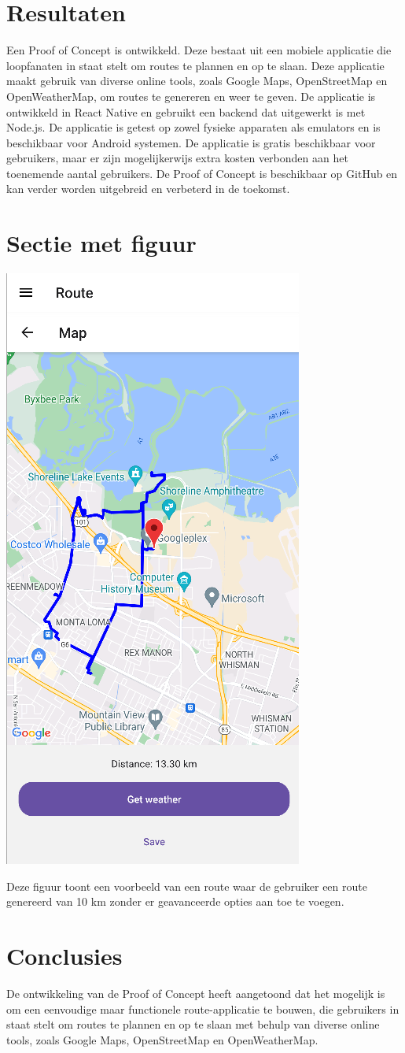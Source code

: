 \documentclass[a0,portrait]{hogent-poster}
\begin{document}
\begin{multicols}{2}
\section{Resultaten}

Een Proof of Concept is ontwikkeld. Deze bestaat uit een mobiele applicatie die loopfanaten in staat stelt om routes te plannen en op te slaan. Deze applicatie maakt gebruik van diverse online tools, zoals Google Maps, OpenStreetMap en OpenWeatherMap, om routes te genereren en weer te geven. De applicatie is ontwikkeld in React Native en gebruikt een backend dat uitgewerkt is met Node.js. De applicatie is getest op zowel fysieke apparaten als emulators en is beschikbaar voor Android systemen. De applicatie is gratis beschikbaar voor gebruikers, maar er zijn mogelijkerwijs extra kosten verbonden aan het toenemende aantal gebruikers. De Proof of Concept is beschikbaar op GitHub en kan verder worden uitgebreid en verbeterd in de toekomst.

\section{Sectie met figuur}


\begin{center}
  \captionsetup{type=figure}
  \includegraphics[height=0.5\linewidth]{graphics/10km_route.png}
\end{center}

Deze figuur toont een voorbeeld van een route waar de gebruiker een route genereerd van 10 km zonder er geavanceerde opties aan toe te voegen.
\section{Conclusies}

De ontwikkeling van de Proof of Concept heeft aangetoond dat het mogelijk is om een eenvoudige maar functionele route-applicatie te bouwen, die gebruikers in staat stelt om routes te plannen en op te slaan met behulp van diverse online tools, zoals Google Maps, OpenStreetMap en OpenWeatherMap.


\end{multicols}
\end{document}
